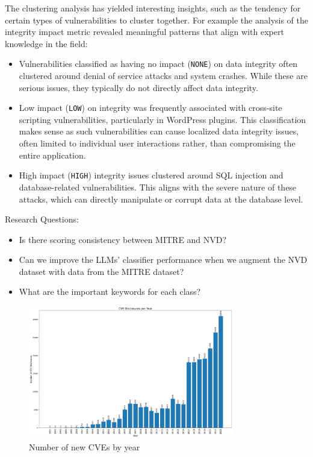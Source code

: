 \documentclass[12pt]{article}
\begin{document}
The clustering analysis has yielded interesting insights, such as the tendency for certain types of
vulnerabilities to cluster together. For example the analysis of the integrity impact metric revealed meaningful patterns that align with expert knowledge in the field:

\begin{itemize}

	\item Vulnerabilities classified as having no impact (\texttt{NONE}) on data integrity often
	      clustered around denial of service attacks and system crashes. While these are serious
	      issues, they typically do not directly affect data integrity.

	\item Low impact (\texttt{LOW}) on integrity was frequently associated with cross-site scripting
	      vulnerabilities, particularly in WordPress plugins. This classification makes sense as such
	      vulnerabilities can cause localized data integrity issues, often limited to individual user
	      interactions rather, than compromising the entire application.

	\item High impact (\texttt{HIGH}) integrity issues clustered around SQL injection and
	      database-related vulnerabilities. This aligns with the severe nature of these attacks, which
	      can directly manipulate or corrupt data at the database level.

\end{itemize}

Research Questions:

\begin{itemize}
	\item Is there scoring consistency between MITRE and NVD?

	\item Can we improve the LLMs' classifier performance when we augment the NVD dataset with data
	      from the MITRE dataset?

	\item What are the important keywords for each class?
\end{itemize}



\begin{figure}[t] \centering
	\includegraphics[width=0.8\textwidth]{figures/cves_per_year.pdf}
	\caption{\label{fig:cves_per_year}Number of new CVEs by year}
\end{figure}
\end{document}
